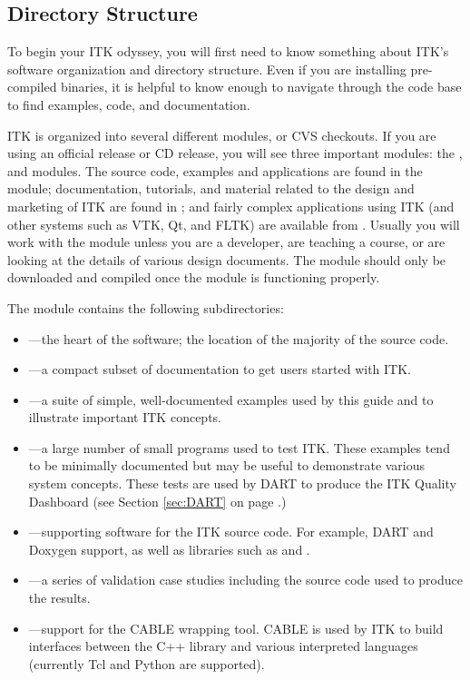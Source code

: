 \subsection{Directory Structure}
\label{sec:DirectoryStructure}

To begin your ITK odyssey, you will first need to know something about ITK's
software organization and directory structure. Even if you are installing
pre-compiled binaries, it is helpful to know enough to navigate through the
code base to find examples, code, and documentation.

ITK is organized into several different modules, or CVS checkouts. If you are
using an official release or CD release, you will see three important modules:
the ,  and 
modules. The source code, examples and applications are found in the
 module; documentation, tutorials, and material related to the
design and marketing of ITK are found in ; and fairly
complex applications using ITK (and other systems such as VTK, Qt, and FLTK)
are available from . Usually you will work with the
 module unless you are a developer, are teaching a course, or
are looking at the details of various design documents. The
 module should only be downloaded and
compiled once
the  module is functioning properly.

The  module contains the following subdirectories:
\begin{itemize}
        \item {}---the heart of the software; the location
        of the majority of the source code.
        \item {}---a compact subset of documentation
        to get users started with ITK.
        \item {}---a suite of simple, well-documented
        examples used by this guide and to illustrate important
        ITK concepts.
        \item {}---a large number of small programs used
        to test ITK. These examples tend to be minimally documented but may
        be useful to demonstrate various system concepts. These tests are 
        used by DART to produce the ITK Quality Dashboard 
        (see Section \ref{sec:DART} on 
        page \pageref{sec:DART}.)
        \item {}---supporting software for the ITK
        source code. For example, DART and Doxygen support, as well as 
        libraries such as  and .
        \item {}---a series of validation case studies
        including the source code used to produce the results.
        \item {}---support for the CABLE wrapping tool.
        CABLE is used by ITK to build interfaces between the C++ library and
        various interpreted languages (currently Tcl and Python are supported).
\end{itemize}

